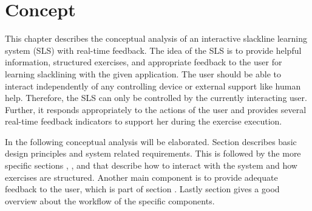\chapter{Concept}\label{4_concept}
This chapter describes the conceptual analysis of an interactive slackline learning system (SLS) with real-time feedback. The idea of the SLS is to provide helpful information, structured exercises, and appropriate feedback to the user for learning slacklining with the given application. 
The user should be able to interact independently of any controlling device or external support like human help. Therefore, the SLS can only be controlled by the currently interacting user. Further, it responds appropriately to the actions of the user and provides several real-time feedback indicators to support her during the exercise execution. 

In the following conceptual analysis will be elaborated. Section \textit{} describes basic design principles and system related requirements. This is followed by the more specific sections \textit{}, \textit{}, and \textit{} that describe how to interact with the system and how exercises are structured. Another main component is to provide adequate feedback to the user, which is part of section \textit{}. Lastly section \textit{} gives a good overview about the workflow of the specific components.






